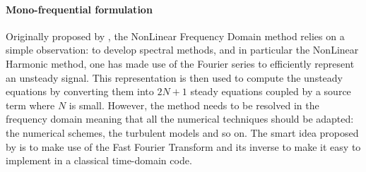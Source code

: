 
\paragraph{Mono-frequential formulation}

Originally proposed by \citet{McMullen2001}, the NonLinear Frequency Domain
method relies on a simple observation: to develop spectral methods, and in
particular the NonLinear Harmonic method, one has made use of the Fourier
series to efficiently represent an unsteady signal.
This representation is then used to compute the unsteady
equations by converting them into $2N+1$ steady equations coupled by a 
source term where $N$ is small.
However, the method needs to be resolved in the frequency domain meaning
that all the numerical techniques should be adapted: the numerical schemes,
the turbulent models and so on. The smart idea 
proposed by \citet{McMullen2001} is to
make use of the Fast Fourier Transform and its inverse to
make it easy to implement in a classical time-domain code.

